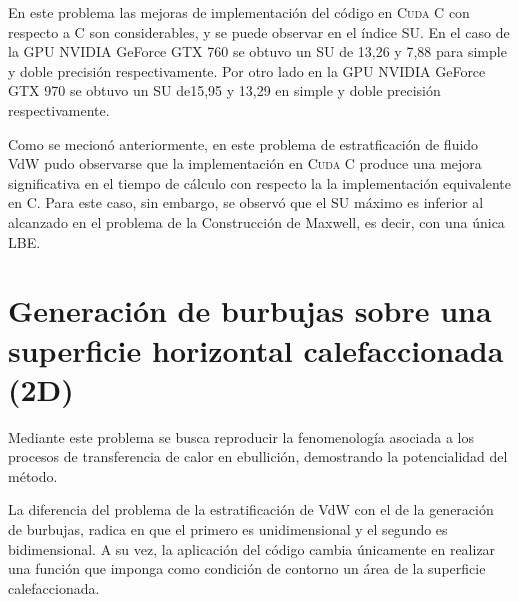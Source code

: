 \newpage


En este problema las mejoras de implementación del código en \textsc{Cuda C} con respecto a \textsc{C} son considerables, y se puede observar en el índice SU. En el caso de la GPU NVIDIA GeForce GTX 760 se obtuvo un SU de 13,26 y 7,88 para simple y doble precisión respectivamente. Por otro lado en la GPU NVIDIA GeForce GTX 970 se obtuvo un SU de15,95 y 13,29 en simple y doble precisión respectivamente.

Como se mecionó anteriormente, en este problema de estratficación de fluido VdW pudo observarse que la implementación en \textsc{Cuda C} produce una mejora significativa en el tiempo de cálculo con respecto la la implementación equivalente en \textsc{C}. Para este caso, sin embargo, se observó que el SU máximo es inferior al alcanzado en el problema de la Construcción de Maxwell, es decir, con una única LBE.

\newpage
\newpage
\section{Generación de burbujas sobre una superficie horizontal calefaccionada (2D)}

Mediante este problema se busca reproducir la fenomenología asociada a los procesos de transferencia de calor en ebullición, demostrando la potencialidad del método. 

La diferencia del problema de la estratificación de VdW con el de la generación de burbujas, radica en que el primero es unidimensional y el segundo es bidimensional. A su vez, la aplicación del código cambia únicamente en realizar una función que imponga como condición de contorno un área de la superficie calefaccionada.


